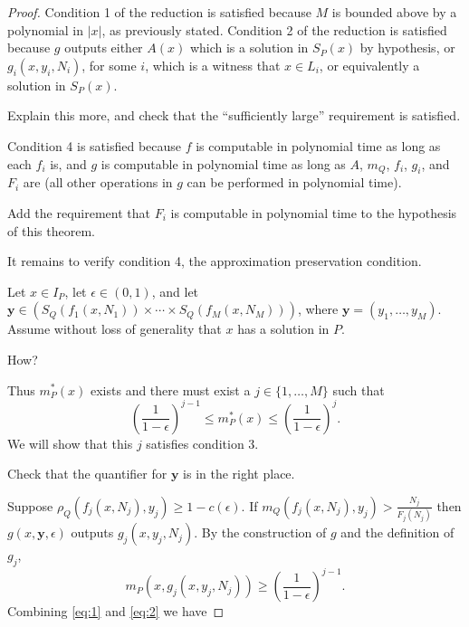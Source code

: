 \documentclass{article}
\begin{document}
\begin{proof}
  Condition 1 of the reduction is satisfied because $M$ is bounded above by a polynomial in $|x|$, as previously stated.
  Condition 2 of the reduction is satisfied because $g$ outputs either $A(x)$ which is a solution in $S_P(x)$ by hypothesis, or $g_i(x, y_i, N_i)$, for some $i$, which is a witness that $x \in L_i$, or equivalently a solution in $S_P(x)$.
  \begin{todo}
    Explain this more, and check that the ``sufficiently large'' requirement is satisfied.
  \end{todo}
  Condition 4 is satisfied because $f$ is computable in polynomial time as long as each $f_i$ is, and $g$ is computable in polynomial time as long as $A$, $m_Q$, $f_i$, $g_i$, and $F_i$ are (all other operations in $g$ can be performed in polynomial time).
  \begin{todo}
    Add the requirement that $F_i$ is computable in polynomial time to the hypothesis of this theorem.
  \end{todo}
  It remains to verify condition 4, the approximation preservation condition.

  Let $x \in I_P$, let $\epsilon \in (0, 1)$, and let $\mathbf{y} \in (S_Q(f_1(x, N_1)) \times \dotsb \times S_Q(f_M(x, N_M)))$, where $\mathbf{y} = (y_1, \dotsc, y_M)$.
  Assume without loss of generality that $x$ has a solution in $P$.
  \begin{todo}
    How?
  \end{todo}
  Thus $m_P^*(x)$ exists and there must exist a $j \in \{1, \dotsc, M\}$ such that
  \begin{equation}\label{eq:1}
    (\frac{1}{1 - \epsilon})^{j - 1} \leq m_P^*(x) \leq (\frac{1}{1 - \epsilon})^j.
  \end{equation}
  We will show that this $j$ satisfies condition 3.
  \begin{todo}
    Check that the quantifier for $\mathbf{y}$ is in the right place.
  \end{todo}
  Suppose $\rho_Q(f_j(x, N_j), y_j) \geq 1 - c(\epsilon)$.
  If $m_Q(f_j(x, N_j), y_j) > \frac{N_j}{F_j(N_j)}$ then $g(x, \mathbf{y}, \epsilon)$ outputs $g_j(x, y_j, N_j)$.
  By the construction of $g$ and the definition of $g_j$,
  \begin{equation}\label{eq:2}
    m_P(x, g_j(x, y_j, N_j)) \geq (\frac{1}{1 - \epsilon})^{j - 1}.
  \end{equation}
  Combining \autoref{eq:1} and \autoref{eq:2} we have
\end{proof}
\end{document}
